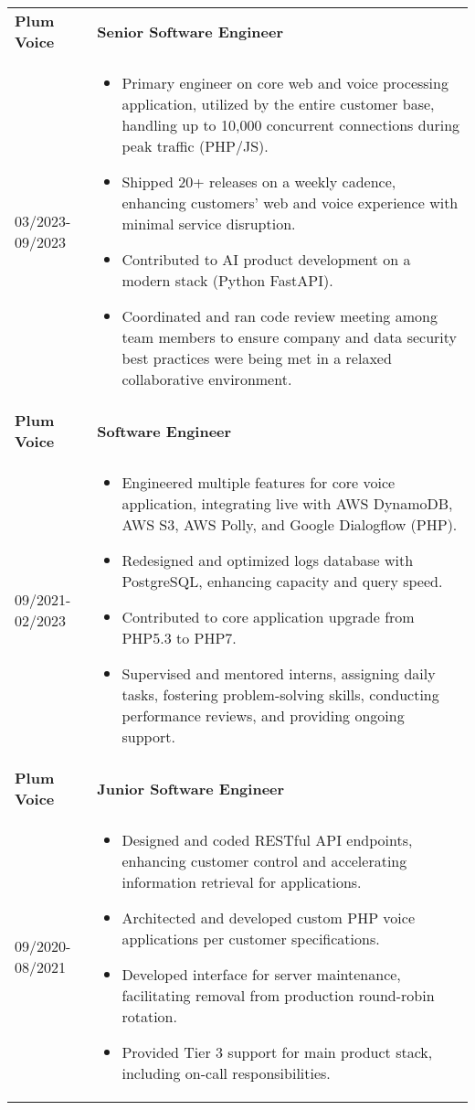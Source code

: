 \documentclass[a4paper,10pt]{article}
\begin{document}
\begin{tabularx}{\linewidth}{l|>{\raggedright\arraybackslash}X}
  \textbf{\textcolor{blueishgray}{Plum Voice}} & \textbf{\textcolor{blueishgray}{Senior Software Engineer}} \\ {\small \textcolor{datecolor}{03/2023-09/2023}} &
  \begin{itemize}[leftmargin=*]
    \item Primary engineer on core web and voice processing application, utilized by the entire customer base, handling up to 10,000 concurrent connections during peak traffic (PHP/JS).
    \item Shipped 20+ releases on a weekly cadence, enhancing customers' web and voice experience with minimal service disruption.
    \item Contributed to AI product development on a modern stack (Python FastAPI).
    \item Coordinated and ran code review meeting among team members to ensure company and data security best practices were being met in a relaxed collaborative environment.
  \end{itemize} \\
  \textbf{\textcolor{blueishgray}{Plum Voice}} & \textbf{\textcolor{blueishgray}{Software Engineer}} \\ {\small \textcolor{datecolor}{09/2021-02/2023}} &
  \begin{itemize}[leftmargin=*]
    \item Engineered multiple features for core voice application, integrating live with AWS DynamoDB, AWS S3, AWS Polly, and Google Dialogflow (PHP).
    \item Redesigned and optimized logs database with PostgreSQL, enhancing capacity and query speed.
    \item Contributed to core application upgrade from PHP5.3 to PHP7.
    \item Supervised and mentored interns, assigning daily tasks, fostering problem-solving skills, conducting performance reviews, and providing ongoing support.
  \end{itemize} \\
  \textbf{\textcolor{blueishgray}{Plum Voice}} & \textbf{\textcolor{blueishgray}{Junior Software Engineer}} \\ {\small \textcolor{datecolor}{09/2020-08/2021}} &
  \begin{itemize}[leftmargin=*]
    \item Designed and coded RESTful API endpoints, enhancing customer control and accelerating information retrieval for applications.
    \item Architected and developed custom PHP voice applications per customer specifications.
    \item Developed interface for server maintenance, facilitating removal from production round-robin rotation.
    \item Provided Tier 3 support for main product stack, including on-call responsibilities.
  \end{itemize} \\
\end{tabularx}
\end{document}
